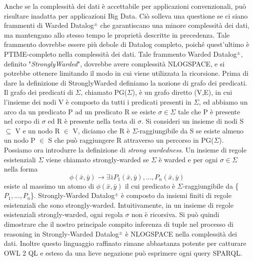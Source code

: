Anche se la complessità dei dati è accettabile per applicazioni convenzionali, può risultare inadatta per applicazioni Big Data. \newline
Ciò solleva una questione se ci siano frammenti di Warded Datalog$^\pm$ che garantiscano una minore complessità dei dati, ma mantengano allo stesso tempo le proprietà descritte in precedenza. Tale frammento dovrebbe essere più debole di Datalog completo, poiché quest'ultimo è PTIME-completo nella complessità dei dati. \newline
Tale frammento Warded Datalog$^\pm$, definito "\emph{StronglyWarded}", dovrebbe avere complessità NLOGSPACE, e si potrebbe ottenere limitando il modo in cui viene utilizzata la ricorsione. Prima di dare la definizione di StronglyWarded definiamo la nozione di grafo dei predicati. \newline
Il grafo dei predicati di $\Sigma$, chiamato PG($\Sigma$), è un grafo diretto (V,E), in cui l'insieme dei nodi V è composto da tutti i predicati presenti in $\Sigma$, ed abbiamo un arco da un predicato P ad un predicato R se esiste $\sigma \in \Sigma$ tale che P è presente nel corpo di $\sigma$ ed R è presente nella testa di $\sigma$. Si consideri un insieme di nodi S $\subseteq$ V e un nodo R $\in$ V, diciamo che R è $\Sigma$-raggiungibile da S se esiste almeno un nodo P $\in$ S che può raggiungere R attraverso un percorso in PG($\Sigma$). \newline
Possiamo ora introdurre la definizione di \emph{strong wardedness}. Un insieme di regole esistenziali $\Sigma$ viene chiamato strongly-warded se $\Sigma$ è warded e per ogni $\sigma \in \Sigma$ nella forma \[\phi(\bar{x}, \bar{y}) \rightarrow \exists \bar{z} P_{1}(\bar{x}, \bar{y}), ..., P_{n}(\bar{x}, \bar{y})\] esiste al massimo un atomo di $\phi(\bar{x}, \bar{y})$ il cui predicato è $\Sigma$-raggiungibile da \{$P_{1}, ..., P_{n}$\}. \newline
Strongly-Warded Datalog$^\pm$ è composto da insiemi finiti di regole esistenziali che sono strongly-warded. \newline
Intuitivamente, in un insieme di regole esistenziali strongly-warded, ogni regola $\sigma$ non è ricorsiva. Si può quindi dimostrare che il nostro principale compito inferenza di tuple nel processo di reasoning in Strongly-Warded Datalog$^\pm$ è NLOGSPACE nella complessità dei dati. Inoltre questo linguaggio raffinato rimane abbastanza potente per catturare OWL 2 QL e esteso da una lieve negazione può esprimere ogni query SPARQL. \newline
